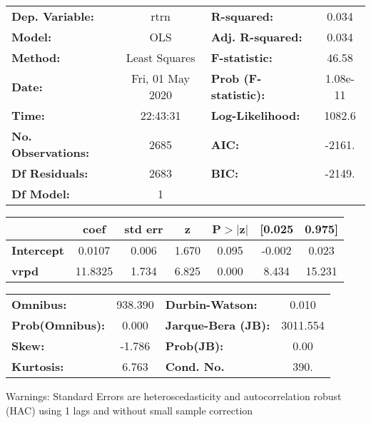 \begin{center}
\begin{tabular}{lclc}
\toprule
\textbf{Dep. Variable:}    &       rtrn       & \textbf{  R-squared:         } &     0.034   \\
\textbf{Model:}            &       OLS        & \textbf{  Adj. R-squared:    } &     0.034   \\
\textbf{Method:}           &  Least Squares   & \textbf{  F-statistic:       } &     46.58   \\
\textbf{Date:}             & Fri, 01 May 2020 & \textbf{  Prob (F-statistic):} &  1.08e-11   \\
\textbf{Time:}             &     22:43:31     & \textbf{  Log-Likelihood:    } &    1082.6   \\
\textbf{No. Observations:} &        2685      & \textbf{  AIC:               } &    -2161.   \\
\textbf{Df Residuals:}     &        2683      & \textbf{  BIC:               } &    -2149.   \\
\textbf{Df Model:}         &           1      & \textbf{                     } &             \\
\bottomrule
\end{tabular}
\begin{tabular}{lcccccc}
                   & \textbf{coef} & \textbf{std err} & \textbf{z} & \textbf{P$> |$z$|$} & \textbf{[0.025} & \textbf{0.975]}  \\
\midrule
\textbf{Intercept} &       0.0107  &        0.006     &     1.670  &         0.095        &       -0.002    &        0.023     \\
\textbf{vrpd}      &      11.8325  &        1.734     &     6.825  &         0.000        &        8.434    &       15.231     \\
\bottomrule
\end{tabular}
\begin{tabular}{lclc}
\textbf{Omnibus:}       & 938.390 & \textbf{  Durbin-Watson:     } &    0.010  \\
\textbf{Prob(Omnibus):} &   0.000 & \textbf{  Jarque-Bera (JB):  } & 3011.554  \\
\textbf{Skew:}          &  -1.786 & \textbf{  Prob(JB):          } &     0.00  \\
\textbf{Kurtosis:}      &   6.763 & \textbf{  Cond. No.          } &     390.  \\
\bottomrule
\end{tabular}
\end{center}

Warnings: \newline
 [1] Standard Errors are heteroscedasticity and autocorrelation robust (HAC) using 1 lags and without small sample correction